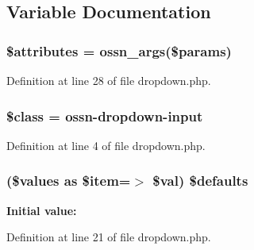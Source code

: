 \subsection{Variable Documentation}
\subsubsection[{\texorpdfstring{\$attributes}{$attributes}}]{\setlength{\rightskip}{0pt plus 5cm}\$attributes = {\bf ossn\+\_\+args}(\$params)}\hypertarget{dropdown_8php_adc851f7a62250e75df0490c0280aef4c}{}\label{dropdown_8php_adc851f7a62250e75df0490c0280aef4c}


Definition at line 28 of file dropdown.\+php.

\subsubsection[{\texorpdfstring{\$class}{$class}}]{\setlength{\rightskip}{0pt plus 5cm}\$class = \textquotesingle{}ossn-\/{\bf dropdown}-\/{\bf input}\textquotesingle{}}\hypertarget{dropdown_8php_a252ba022809910ea710a068fc1bab657}{}\label{dropdown_8php_a252ba022809910ea710a068fc1bab657}


Definition at line 4 of file dropdown.\+php.

\subsubsection[{\texorpdfstring{\$defaults}{$defaults}}]{ (\$values as \$item=$>$ \${\bf val}) \${\bf defaults}}\hypertarget{dropdown_8php_a0035e272a293e029297f6ed19d3bb10d}{}\label{dropdown_8php_a0035e272a293e029297f6ed19d3bb10d}
{\bfseries Initial value\+:}


Definition at line 21 of file dropdown.\+php.


